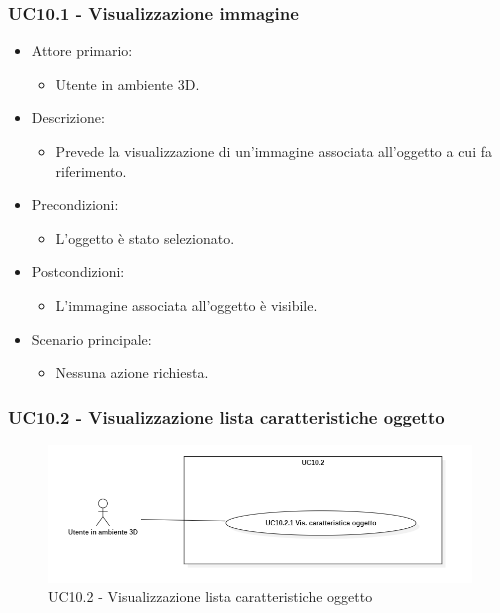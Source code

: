\subsubsection{UC10.1 - Visualizzazione immagine}
\begin{itemize}
	
	\item Attore primario: 
	\begin{itemize}
		\item Utente in ambiente 3D.
	\end{itemize}
	\item Descrizione:
	\begin{itemize}
		\item Prevede la visualizzazione di un'immagine associata all'oggetto a cui fa riferimento.
	\end{itemize}
	
	\item Precondizioni:
	\begin{itemize}
		\item L'oggetto è stato selezionato.
	\end{itemize}
	
	\item Postcondizioni:
	\begin{itemize}
		\item L'immagine associata all'oggetto è visibile.
	\end{itemize}
	
	\item Scenario principale:
	\begin{itemize}
		\item Nessuna azione richiesta.
	\end{itemize}
	
\end{itemize}


\subsubsection{UC10.2 - Visualizzazione lista caratteristiche oggetto}

\begin{figure}[H]
  \renewcommand{\thefigure}{14}
  \includegraphics[width=\linewidth]{./res/images/UC10.2.png}
  \caption{UC10.2 - Visualizzazione lista caratteristiche oggetto}
  \label{fig:UC 10.2}
\end{figure}

